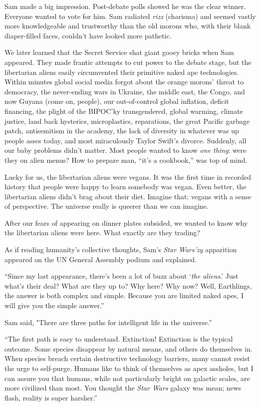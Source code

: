 Sam made a big impression. Post-debate polls showed he was the clear
winner. Everyone wanted to vote for him. Sam radiated \emph{rizz}
(charisma) and seemed vastly more knowledgeable and trustworthy than the
old morons who, with their blank diaper-filled faces, couldn't have
looked more pathetic.~

We later learned that the Secret Service shat giant gooey bricks when
Sam appeared. They made frantic attempts to cut power to the debate
stage, but the libertarian aliens easily circumvented their primitive
naked ape technologies. Within minutes global social media forgot about
the orange morons' threat to democracy, the never-ending wars in
Ukraine, the middle east, the Congo, and now Guyana (come on, people),
our out-of-control global inflation, deficit financing, the plight of
the BIPOC'ky transgendered, global warming, climate justice, land back
hysterics, microplastics, reparations, the great Pacific garbage patch,
antisemitism in the academy, the lack of diversity in whatever was up
people asses today, and most miraculously Taylor Swift's divorce.
Suddenly, all our baby problems didn't matter. Most people wanted to
know \emph{one thing}: were they on alien menus? How to prepare man,
``it's a cookbook,'' was top of mind.

Lucky for us, the libertarian aliens were vegans. It was the first time
in recorded history that people were happy to learn somebody was vegan.
Even better, the libertarian aliens didn't brag about their diet.
Imagine that: vegans with a sense of perspective. The universe really is
queerer than we can imagine.

After our fears of appearing on dinner plates subsided, we wanted to
know why the libertarian aliens were here. What exactly are they
trading?

As if reading humanity's collective thoughts, Sam's \emph{Star Wars'zy}
apparition appeared on the UN General Assembly podium and explained.

``Since my last appearance, there's been a lot of buzz about `\emph{the
aliens}.' Just what's their deal? What are they up to? Why here? Why
now? Well, Earthlings, the answer is both complex and simple. Because
you are limited naked apes, I will give you the simple answer.''

Sam said, "There are three paths for intelligent life in the universe.''

``The first path is easy to understand. Extinction! Extinction is the
typical outcome. Some species disappear by natural means, and others do
themselves in. When species breach certain destructive technology
barriers, many cannot resist the urge to self-purge. Humans like to
think of themselves as apex assholes, but I can assure you that humans,
while not particularly bright on galactic scales, are more civilized
than most. You thought the \emph{Star Wars} galaxy was mean; news flash,
reality is super harsher.''

